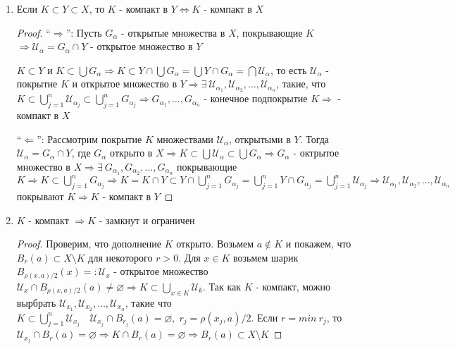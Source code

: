 \begin{theorem-non} \quad 

    \begin{enumerate}
        \item Если $K \subset Y \subset X$, то $K$ - компакт в $Y \Longleftrightarrow K$ - компакт в $X$ 
        \begin{proof} \quad
            
            ``$\Longrightarrow$'': Пусть $G_{\alpha}$ - открытые множества в $X$, покрывающие $K$
            $\Longrightarrow \mathcal{U}_{\alpha} = G_{\alpha}\cap Y$ - открытое множество в $Y$

            $K \subset Y$ и $K \subset \bigcup G_{\alpha} \Longrightarrow K \subset Y \cap \bigcup G_{\alpha} =
            \bigcup Y \cap G_{\alpha} = \bigcap \mathcal{U}_{\alpha}$, то есть $\mathcal{U}_{\alpha}$ - 
            покрытие $K$ и открытое множество в $Y \Longrightarrow \exists \ \mathcal{U}_{\alpha_1}, \mathcal{U}_{\alpha_2}, \dots, \mathcal{U}_{\alpha_n}$, 
            такие, что $K \subset \bigcup\limits_{j = 1}^{n} \mathcal{U}_{\alpha_j} \subset \bigcup\limits_{j = 1}^{n} G_{\alpha_j} \Longrightarrow 
            G_{\alpha_1}, \dots, G_{\alpha_n}$ - конечное подпокрытие $K \Longrightarrow$ - компакт в $X$

            ``$\Longleftarrow$'': Рассмотрим покрытие $K$ множествами $\mathcal{U}_{\alpha}$, открытыми в $Y$. Тогда $\mathcal{U}_{\alpha} = G_{\alpha} \cap Y$, 
            где $G_{\alpha}$ открыто в $X \Longrightarrow K \subset \bigcup \mathcal{U}_{\alpha} \subset \bigcup G_{\alpha} \Longrightarrow
            G_{\alpha}$ - октрытое множество в $X \Longrightarrow \exists \ G_{\alpha_1}, G_{\alpha_2}, \dots, G_{\alpha_n}$ покрывающие $K \Longrightarrow
            K \subset \bigcup\limits_{j=1}^{n} G_{\alpha_j} \Longrightarrow K = K \cap Y \subset 
            Y \cap \bigcup\limits_{j=1}^{n} G_{\alpha_j} = \bigcup\limits_{j=1}^{n} Y \cap G_{\alpha_j} = \bigcup\limits_{j=1}^{n} \mathcal{U}_{\alpha_j}
            \Longrightarrow \mathcal{U}_{\alpha_1}, \mathcal{U}_{\alpha_2}, \dots, \mathcal{U}_{\alpha_n}$ покрывают $K \Longrightarrow K$ - компакт в $Y$  
        \end{proof}
        \item $K$ - компакт $\Longrightarrow K$ - замкнут и ограничен
        \begin{proof} \quad
            Проверим, что дополнение $K$ открыто. Возьмем $a \notin K$ и покажем, что 
            $B_r(a) \subset X \setminus K$ для некоторого $r > 0$. Для $x \in K$ возьмем шарик $B_{\rho(x, a)/2}(x) =: \mathcal{U}_x$
            - открытое множество $\mathcal{U}_x \cap B_{\rho(x, a)/2}(a) \neq \varnothing \Longrightarrow K \subset \bigcup\limits_{x \in K} \mathcal{U}_k$.
            Так как $K$ - компакт, можно вырбрать $\mathcal{U}_{x_1}, \mathcal{U}_{x_2}, \dots, \mathcal{U}_{x_n}$, такие что $K \subset \bigcup\limits_{j = 1}^{n} \mathcal{U}_{x_j}
            \quad \mathcal{U}_{x_j} \cap B_{r_j}(a) = \varnothing, \; r_j = \rho(x_j, a)/2$. Если $r = min \ r_j$, то $\mathcal{U}_{x_j} \cap B_{r}(a) = \varnothing \Longrightarrow K \cap B_r(a) = \varnothing 
            \Longrightarrow B_r(a) \subset X \setminus K$ 


\end{proof}
\end{enumerate}
\end{theorem-non}
